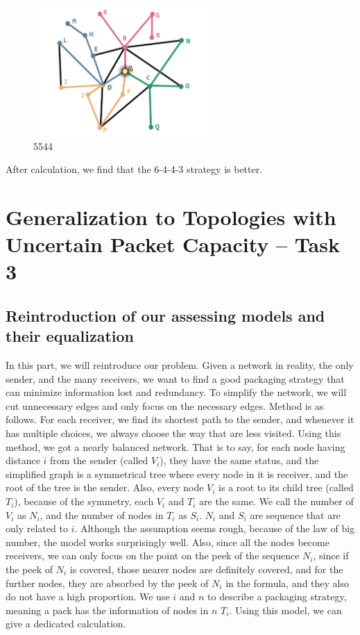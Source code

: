 \documentclass{mcmthesis}
\begin{document}
\begin{figure}[H]
	\centering
	\includegraphics[width = 0.6\textwidth]{figure/5544.png}
	\caption{5544}
	\label{fig:1-2}
\end{figure}

After calculation, we find that the 6-4-4-3 strategy is better.

\section{Generalization to Topologies with Uncertain Packet Capacity -- Task 3}
\subsection{Reintroduction of our assessing models and their equalization}

In this part, we will reintroduce our problem. Given a network in reality, the only sender, and the many receivers, we want to find a good packaging strategy that can minimize information lost and
redundancy. To simplify the network, we will cut unnecessary edges and only focus on the necessary edges. Method is as follows. For each receiver, we find its shortest path to the sender, and whenever
it has multiple choices, we always choose the way that are less visited. Using this method, we got a nearly balanced network. That is to say, for each node having distance $i$ from the sender (called $V_{i}$),
they have the same status, and the simplified graph is a symmetrical tree where every node in it is receiver, and the root of the tree is the sender. Also, every node $V_{i}$ is a root to its child tree (called $T_{i}$),
because of the symmetry, each $V_{i}$ and $T_{i}$ are the same. We call the number of $V_{i}$ as $N_{i}$, and the number of nodes in $T_{i}$ as $S_{i}$. $N_{i}$ and $S_{i}$ are sequence that are only related to $i$.
Although the assumption seems rough, because of the law of big number, the model works surprisingly well. Also, since all the nodes become receivers, we can only focus on the point on the peek of the sequence $N_{i}$,
since if the peek of $N_{i}$ is covered, those nearer nodes are definitely covered, and for the further nodes, they are absorbed by the peek of $N_{i}$ in the formula, and they also do not have a high proportion. We use $i$ and $n$
to describe a packaging strategy, meaning a pack has the information of nodes in $n$ $T_{i}$. Using this model, we can give a dedicated calculation.
\end{document}
